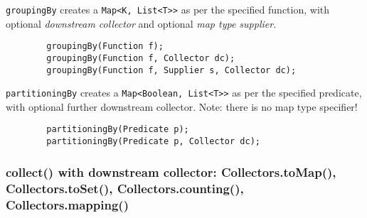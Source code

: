 \documentclass{scrartcl}
\begin{document}
    \lstinline{groupingBy} creates a \lstinline{Map<K, List<T>>} as per the specified function, with optional \textit{downstream collector} and optional \textit{map type supplier}.

    \begin{lstlisting}
        groupingBy(Function f);
        groupingBy(Function f, Collector dc);
        groupingBy(Function f, Supplier s, Collector dc);
    \end{lstlisting}

    \lstinline{partitioningBy} creates a \lstinline{Map<Boolean, List<T>>} as per the specified predicate, with optional further downstream collector.
    Note: there is no map type specifier!

    \begin{lstlisting}
        partitioningBy(Predicate p);
        partitioningBy(Predicate p, Collector dc);
    \end{lstlisting}

\subsubsection{collect() with downstream collector: Collectors.toMap(), Collectors.toSet(), Collectors.counting(), Collectors.mapping()}
\end{document}
